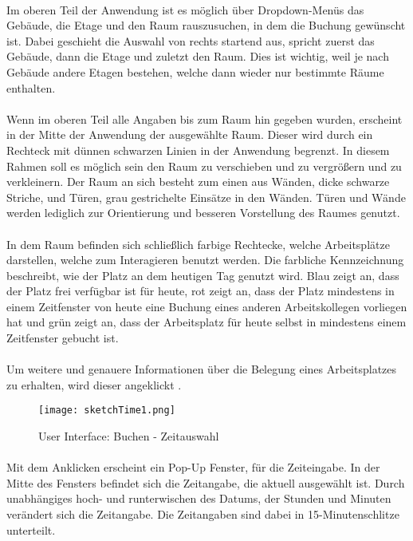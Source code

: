 \paragraph{}Im oberen Teil der Anwendung ist es möglich über Dropdown-Menüs das Gebäude, die Etage und den Raum rauszusuchen, in dem die Buchung gewünscht ist.
Dabei geschieht die Auswahl von rechts startend aus, spricht zuerst das Gebäude, dann die Etage und zuletzt den Raum.
Dies ist wichtig, weil je nach Gebäude andere Etagen bestehen, welche dann wieder nur bestimmte Räume enthalten.

\paragraph{}Wenn im oberen Teil alle Angaben bis zum Raum hin gegeben wurden, erscheint in der Mitte der Anwendung der ausgewählte Raum.
Dieser wird durch ein Rechteck mit dünnen schwarzen Linien in der Anwendung begrenzt.
In diesem Rahmen soll es möglich sein den Raum zu verschieben und zu vergrößern und zu verkleinern.
Der Raum an sich besteht zum einen aus Wänden, dicke schwarze Striche, und Türen, grau gestrichelte Einsätze in den Wänden. Türen und Wände werden 
lediglich zur Orientierung und besseren Vorstellung des Raumes genutzt. 
\paragraph{}In dem Raum befinden sich schließlich farbige Rechtecke, welche Arbeitsplätze darstellen, welche zum Interagieren benutzt werden. Die farbliche Kennzeichnung beschreibt, wie der Platz an dem heutigen Tag genutzt wird.
Blau zeigt an, dass der Platz frei verfügbar ist für heute, rot zeigt an, dass der Platz mindestens in einem Zeitfenster von heute eine Buchung eines anderen Arbeitskollegen vorliegen hat und grün zeigt an, dass der Arbeitsplatz für heute selbst in mindestens einem Zeitfenster gebucht ist.
\paragraph{}Um weitere und genauere Informationen über die Belegung eines Arbeitsplatzes zu erhalten, wird dieser angeklickt .

\begin{wrapfigure}[21]{l}{5.5cm}
  \texttt{[image: sketchTime1.png]}
  \caption{User Interface: Buchen - Zeitauswahl}
\end{wrapfigure}

\paragraph{}Mit dem Anklicken erscheint ein Pop-Up Fenster, für die Zeiteingabe. 
In der Mitte des Fensters befindet sich die Zeitangabe, die aktuell ausgewählt ist. 
Durch unabhängiges hoch- und runterwischen des Datums, der Stunden und Minuten verändert sich die Zeitangabe.
Die Zeitangaben sind dabei in 15-Minutenschlitze unterteilt.

